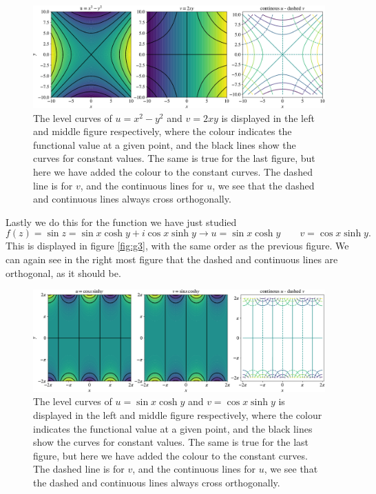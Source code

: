 \documentclass[12pt,twoside]{article}
\begin{document}
\begin{figure}
  \centering
  \includegraphics[width=\textwidth]{../figures/secound.pdf}
  \caption{The level curves of $u=x^2-y^2$ and $v=2xy$ is displayed in the left and middle figure respectively, where the colour indicates the functional value at a given point, and the black lines show the curves for constant values. The same is true for the last figure, but here we have added the colour to the constant curves. The dashed line is for $v$, and the continuous lines for $u$, we see that the dashed and continuous lines always cross orthogonally.}
  \label{fig:g2}
\end{figure}
Lastly we do this for the function we have just studied
\begin{equation}
  f(z) = \sin{z} = \sin{x}\cosh{y}+i\cos{x}\sinh{y} \rightarrow u=\sin{x}\cosh{y}\qquad v=\cos{x}\sinh{y}.
\end{equation}
This is displayed in figure \vref{fig:g3}, with the same order as the previous figure. We can again see in the right most figure that the dashed and continuous lines are orthogonal, as it should be.\par
\begin{figure}
  \centering
  \includegraphics[width=\textwidth]{../figures/third.pdf}
  \caption{The level curves of $u=\sin{x}\cosh{y}$ and $v=\cos{x}\sinh{y}$ is displayed in the left and middle figure respectively, where the colour indicates the functional value at a given point, and the black lines show the curves for constant values. The same is true for the last figure, but here we have added the colour to the constant curves. The dashed line is for $v$, and the continuous lines for $u$, we see that the dashed and continuous lines always cross orthogonally.}
  \label{fig:g3}
\end{figure}
\end{document}

